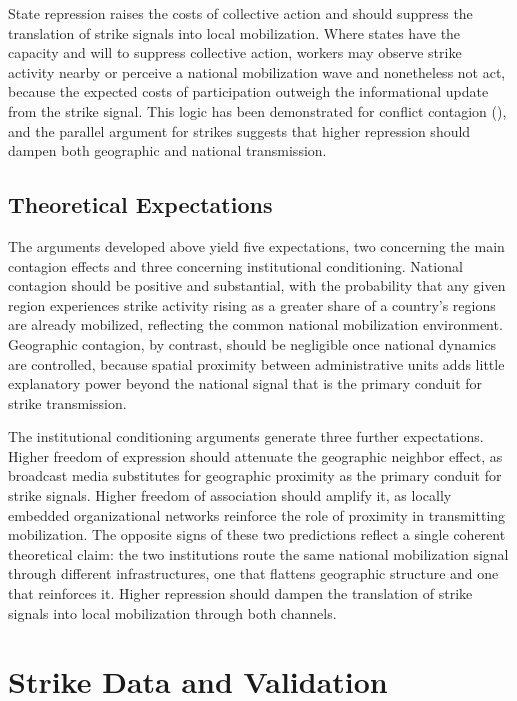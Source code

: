 \documentclass[
  11pt,
]{article}
\begin{document}
State repression raises the costs of collective action and should
suppress the translation of strike signals into local mobilization.
Where states have the capacity and will to suppress collective action,
workers may observe strike activity nearby or perceive a national
mobilization wave and nonetheless not act, because the expected costs of
participation outweigh the informational update from the strike signal.
This logic has been demonstrated for conflict contagion
(), and the parallel
argument for strikes suggests that higher repression should dampen both
geographic and national transmission.

\subsection{Theoretical Expectations}\label{theoretical-expectations}

The arguments developed above yield five expectations, two concerning
the main contagion effects and three concerning institutional
conditioning. National contagion should be positive and substantial,
with the probability that any given region experiences strike activity
rising as a greater share of a country's regions are already mobilized,
reflecting the common national mobilization environment. Geographic
contagion, by contrast, should be negligible once national dynamics are
controlled, because spatial proximity between administrative units adds
little explanatory power beyond the national signal that is the primary
conduit for strike transmission.

The institutional conditioning arguments generate three further
expectations. Higher freedom of expression should attenuate the
geographic neighbor effect, as broadcast media substitutes for
geographic proximity as the primary conduit for strike signals. Higher
freedom of association should amplify it, as locally embedded
organizational networks reinforce the role of proximity in transmitting
mobilization. The opposite signs of these two predictions reflect a
single coherent theoretical claim: the two institutions route the same
national mobilization signal through different infrastructures, one that
flattens geographic structure and one that reinforces it. Higher
repression should dampen the translation of strike signals into local
mobilization through both channels.

\section{Strike Data and Validation}\label{strike-data-and-validation}
\end{document}

